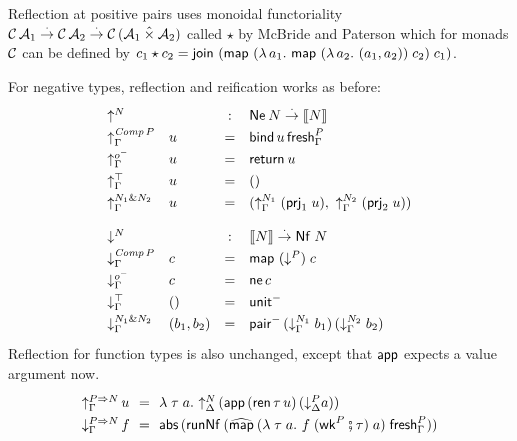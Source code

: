\documentclass[sigplan,screen,fleqn]{acmart}
\begin{document}
Reflection at positive pairs uses monoidal functoriality
$\mathcal{C}\,\mathcal{A}_1 \stackrel{\cdot}{\to} \mathcal{C}\,\mathcal{A}_2 \stackrel{\cdot}{\to} \mathcal{C}\,(\mathcal{A}_1 \mathbin{\hat\times} \mathcal{A}_2)$
called $\star$ by McBride and Paterson \cite[Section 7]{mcbridePaterson:applicative}
which for monads $\mathcal{C}$ can be defined by
$c_1 \star c_2 =
   \mathsf{join}^{} \; (\mathsf{map}^{}\;(\lambda\,a_1.\
   \mathsf{map}^{}\;(\lambda\,a_2.\ (a_1,a_2))
    \;c_2)
    \;c_1)$.

For negative types, reflection and reification works as before:
\[
\renewcommand{\left}{}
\renewcommand{\right}{}
\def\arraystretch{1.3}
\begin{array}{llcl} %
  \multicolumn 2 l {\up N} & : & \tNe\,N \todot \den N \\
  \upG {\Comp P} & u & = & \tbind\,u\,\tfresh^P_\Gamma \\
  \upG \natom    & u & = & \treturn\,u \\
  \upG \top      & u & = & \ttempty \\
  \upG {N_1 \ntimes N_2} & u & = & \left(
    \upG {N_1} \; (\prj 1 u)
    ,\
    \upG {N_2} \; (\prj 2 u)
    \right)
\\[2ex]
  \multicolumn 2 l {\down N} & : & \den N \todot \tNf\;N \\
  \downG {\Comp P} & c  & = & \tmap\;(\down P)\;c \\
  \downG \natom    & c  & = & \tne\,c \\
  \downG \top      & () & = & \nunit \\
  \downG {N_1 \ntimes N_2} & (b_1,b_2) & = & \npair
    \, (\downG {N_1} \; b_1)
    \, (\downG {N_2} \; b_2)
    \\
\end{array}
\]
Reflection for function types is also unchanged, except that $\mathsf{app}$
expects a value argument now.
\[
\def\arraystretch{1.3}
\renewcommand{\left}{\,}
\renewcommand{\right}{}
\begin{array}{l@{\,}l@{~~}c@{~~}l}
  \upG {P \To N} & u & = & \lambda
    \; \tau \; a
    . \
    \up[\Delta] N \left( \tapp\,(\tren\,\tau\,u)\,(\down[\Delta] P a) \right)
    \\
  \downG {P \To N} & f & = & \tabs \left( \trunNf \left(
    \stmap
      \left(
        \lambda
          \; \tau \; a
          . \
          f\; (\twk^P \rcomp \tau)\; a
        \right)
      \;\tfresh^P_\Gamma
    \right) \right)
    \\
\end{array}
\]
\end{document}
